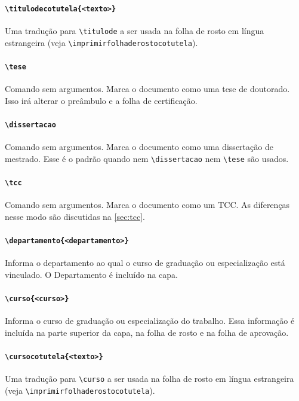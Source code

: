 \documentclass[embeddedlogo]{ufsc-thesis-rn46-2019}
\newcommand{\lacmd}[1]{\texttt{\textbackslash{}#1}}
\begin{document}
\paragraph*{\lacmd{titulodecotutela\{<texto>\}}} Uma tradução para
\lacmd{titulode} a ser usada na folha de rosto em língua estrangeira (veja
\lacmd{imprimirfolhaderostocotutela}).

\paragraph*{\lacmd{tese}} Comando sem argumentos. Marca o documento como uma
tese de doutorado. Isso irá alterar o preâmbulo e a folha de certificação.

\paragraph*{\lacmd{dissertacao}} Comando sem argumentos. Marca o documento como
uma dissertação de mestrado. Esse é o padrão quando nem \lacmd{dissertacao} nem
\lacmd{tese} são usados.

\paragraph*{\lacmd{tcc}} Comando sem argumentos. Marca o documento como um
TCC. As diferenças nesse modo são discutidas na \autoref{sec:tcc}.

\paragraph*{\lacmd{departamento\{<departamento>\}}} Informa o departamento ao
qual o curso de graduação ou especialização está vinculado. O Departamento é
incluído na capa.

\paragraph*{\lacmd{curso\{<curso>\}}} Informa o curso de graduação
ou especialização do trabalho. Essa informação é incluída na parte superior da
capa, na folha de rosto e na folha de aprovação.

\paragraph*{\lacmd{cursocotutela\{<texto>\}}} Uma tradução para
\lacmd{curso} a ser usada na folha de rosto em língua estrangeira (veja
\lacmd{imprimirfolhaderostocotutela}).
\end{document}
